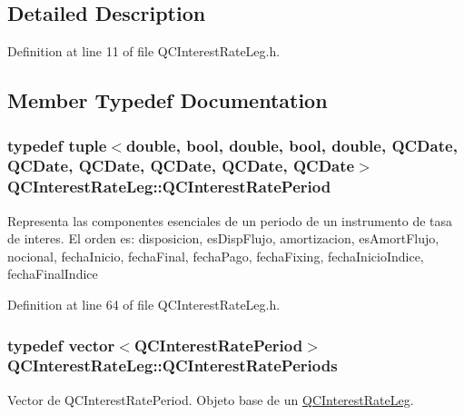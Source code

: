 \subsection{Detailed Description}


Definition at line 11 of file Q\+C\+Interest\+Rate\+Leg.\+h.



\subsection{Member Typedef Documentation}
\hypertarget{class_q_c_interest_rate_leg_af680c8ddf16eba5370b8a71c60955f98}{
\subsubsection[{Q\+C\+Interest\+Rate\+Period}]{\setlength{\rightskip}{0pt plus 5cm}typedef tuple$<$double, bool, double, bool, double, {\bf Q\+C\+Date}, {\bf Q\+C\+Date}, {\bf Q\+C\+Date}, {\bf Q\+C\+Date}, {\bf Q\+C\+Date}, {\bf Q\+C\+Date}$>$ {\bf Q\+C\+Interest\+Rate\+Leg\+::\+Q\+C\+Interest\+Rate\+Period}}}\label{class_q_c_interest_rate_leg_af680c8ddf16eba5370b8a71c60955f98}
Representa las componentes esenciales de un periodo de un instrumento de tasa de interes. El orden es\+: disposicion, es\+Disp\+Flujo, amortizacion, es\+Amort\+Flujo, nocional, fecha\+Inicio, fecha\+Final, fecha\+Pago, fecha\+Fixing, fecha\+Inicio\+Indice, fecha\+Final\+Indice 

Definition at line 64 of file Q\+C\+Interest\+Rate\+Leg.\+h.

\hypertarget{class_q_c_interest_rate_leg_ad04f1da06a7b5d44fea906bd8c62de28}{
\subsubsection[{Q\+C\+Interest\+Rate\+Periods}]{\setlength{\rightskip}{0pt plus 5cm}typedef vector$<${\bf Q\+C\+Interest\+Rate\+Period}$>$ {\bf Q\+C\+Interest\+Rate\+Leg\+::\+Q\+C\+Interest\+Rate\+Periods}}}\label{class_q_c_interest_rate_leg_ad04f1da06a7b5d44fea906bd8c62de28}
Vector de Q\+C\+Interest\+Rate\+Period. Objeto base de un \hyperlink{class_q_c_interest_rate_leg}{Q\+C\+Interest\+Rate\+Leg}. 

